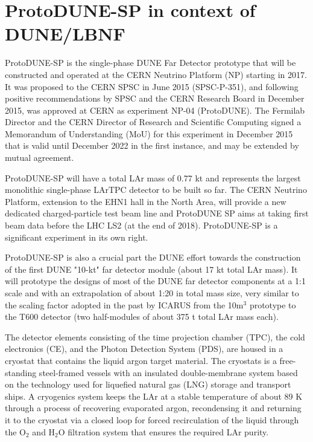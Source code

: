 



\section{ProtoDUNE-SP in context of DUNE/LBNF}

ProtoDUNE-SP is the single-phase DUNE Far Detector prototype that will be constructed and operated at the CERN Neutrino Platform (NP) starting in 2017. It was proposed to the CERN SPSC in June 2015 (SPSC-P-351), and following positive recommendations by SPSC and the CERN Research Board in December 2015, was approved at CERN as experiment NP-04 (ProtoDUNE). The Fermilab Director and the CERN Director of Research and Scientific Computing signed a Memorandum of Understanding (MoU) for this experiment in December 2015 that is valid until December 2022 in the first instance, and may be extended by mutual agreement. 

ProtoDUNE-SP will have a total LAr mass of 0.77 kt and represents the largest monolithic single-phase LArTPC detector to be built so far. 
The CERN Neutrino Platform, extension to the EHN1 hall in the North Area, will provide a new dedicated charged-particle test beam line and ProtoDUNE SP aims at taking first beam data before the LHC LS2 (at the end of 2018). ProtoDUNE-SP is a significant experiment in its own right. 

ProtoDUNE-SP is also a crucial part the DUNE effort towards the construction of the first DUNE "10-kt" far detector module (about 17 kt total LAr mass). It will prototype the designs of most of the DUNE far detector components at a 1:1 scale and with an extrapolation of about 1:20 in total mass size, very similar to the scaling factor adopted in the past by ICARUS from the 10m$^3$ prototype to the T600 detector (two half-modules of about 375 t total LAr mass each).

The detector elements consisting of the time projection chamber (TPC), the cold electronics (CE), and the Photon Detection System (PDS), are housed in a cryostat that contains the liquid argon target material. The cryostats is a free-standing steel-framed vessels with an insulated double-membrane system based on the technology used for liquefied natural gas (LNG) storage and transport ships. 
A cryogenics system keeps the LAr at a stable temperature of about 89 K through a process of recovering evaporated argon, recondensing it and returning it to the cryostat via a closed loop 
for forced recirculation of the liquid through the O$_2$ and H$_2$O filtration system that ensures the required LAr purity. 

